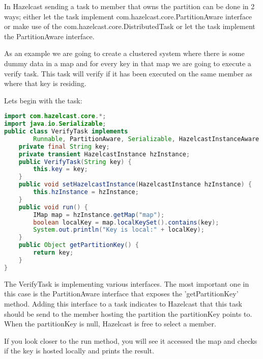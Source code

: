In Hazelcast sending a task to member that owns the partition can be done in 2 ways; either let the task implement com.hazelcast.core.PartitionAware interface or make use of the com.hazelcast.core.DistributedTask or let the task implement the PartitionAware interface.

As an example we are going to create a clustered system where there is some dummy data in a map and for every key in that map we are going to execute a verify task. This task will verify if it has been executed on the same member as where that key is residing.

Lets begin with the task:
\begin{lstlisting}[language=java]
import com.hazelcast.core.*;
import java.io.Serializable;
public class VerifyTask implements
        Runnable, PartitionAware, Serializable, HazelcastInstanceAware {
    private final String key;
    private transient HazelcastInstance hzInstance;
    public VerifyTask(String key) {
        this.key = key;
    }
    public void setHazelcastInstance(HazelcastInstance hzInstance) {
        this.hzInstance = hzInstance;
    }
    public void run() {
        IMap map = hzInstance.getMap("map");
        boolean localKey = map.localKeySet().contains(key);
        System.out.println("Key is local:" + localKey);
    }
    public Object getPartitionKey() {
        return key;
    }
}
\end{lstlisting}
The VerifyTask is implementing various interfaces. The most important one in this case is the PartitionAware interface that exposes the 'getPartitionKey' method. Adding this interface to a task indicates to Hazelcast that this task should be send to the member hosting the partition the partitionKey points to. When the partitionKey is null, Hazelcast is free to select a member.

If you look closer to the run method, you will see it accessed the map and checks if the key is hosted locally and prints the result.

